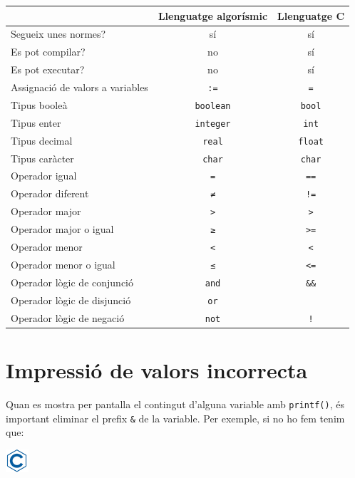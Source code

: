 \documentclass[]{book}
\newenvironment{Shaded}{\begin{snugshade}}{\end{snugshade}}
\newcommand{\DataTypeTok}[1]{\textcolor[rgb]{0.13,0.29,0.53}{#1}}
\newcommand{\DecValTok}[1]{\textcolor[rgb]{0.00,0.00,0.81}{#1}}
\newcommand{\SpecialCharTok}[1]{\textcolor[rgb]{0.00,0.00,0.00}{#1}}
\newcommand{\StringTok}[1]{\textcolor[rgb]{0.31,0.60,0.02}{#1}}
\newcommand{\ImportTok}[1]{#1}
\newcommand{\ControlFlowTok}[1]{\textcolor[rgb]{0.13,0.29,0.53}{\textbf{#1}}}
\newcommand{\PreprocessorTok}[1]{\textcolor[rgb]{0.56,0.35,0.01}{\textit{#1}}}
\newcommand{\NormalTok}[1]{#1}
\begin{document}
\begin{longtable}[]{@{}lcc@{}}
\toprule
& Llenguatge algorísmic & Llenguatge C\tabularnewline
\midrule
\endhead
Segueix unes normes? & sí & sí\tabularnewline
Es pot compilar? & no & sí\tabularnewline
Es pot executar? & no & sí\tabularnewline
Assignació de valors a variables & \texttt{:=} &
\texttt{=}\tabularnewline
Tipus booleà & \texttt{boolean} & \texttt{bool}\tabularnewline
Tipus enter & \texttt{integer} & \texttt{int}\tabularnewline
Tipus decimal & \texttt{real} & \texttt{float}\tabularnewline
Tipus caràcter & \texttt{char} & \texttt{char}\tabularnewline
Operador igual & \texttt{=} & \texttt{==}\tabularnewline
Operador diferent & \texttt{≠} & \texttt{!=}\tabularnewline
Operador major & \texttt{\textgreater{}} &
\texttt{\textgreater{}}\tabularnewline
Operador major o igual & \texttt{≥} &
\texttt{\textgreater{}=}\tabularnewline
Operador menor & \texttt{\textless{}} &
\texttt{\textless{}}\tabularnewline
Operador menor o igual & \texttt{≤} &
\texttt{\textless{}=}\tabularnewline
Operador lògic de conjunció & \texttt{and} &
\texttt{\&\&}\tabularnewline
Operador lògic de disjunció & \texttt{or} &
\texttt{\textbar{}\textbar{}}\tabularnewline
Operador lògic de negació & \texttt{not} & \texttt{!}\tabularnewline
\bottomrule
\end{longtable}

\section{Impressió de valors
incorrecta}\label{impressio-de-valors-incorrecta}

Quan es mostra per pantalla el contingut d'alguna variable amb
\texttt{printf()}, és important eliminar el prefix \texttt{\&} de la
variable. Per exemple, si no ho fem tenim que:

\includegraphics{./img/c.png}

\begin{Shaded}
\end{Shaded}
\end{document}
